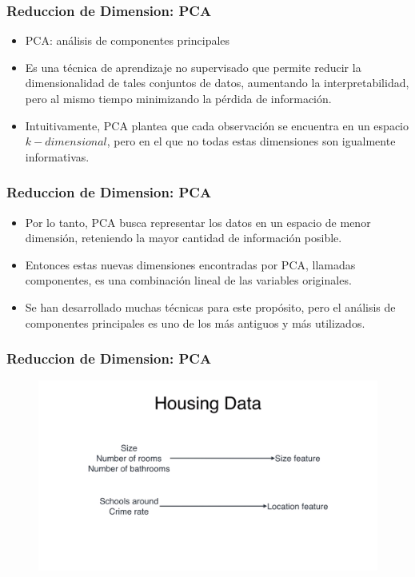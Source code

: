 \documentclass[
  shownotes,
  xcolor={svgnames},
  hyperref={colorlinks,citecolor=DarkBlue,linkcolor=DarkRed,urlcolor=DarkBlue}
  , aspectratio=169]{beamer}
\begin{document}
\begin{frame}
\frametitle{Reduccion de Dimension: PCA}


\begin{itemize}
  \item PCA: análisis de componentes principales
\medskip
\item Es una técnica de aprendizaje no supervisado que permite reducir la dimensionalidad de tales conjuntos de datos, aumentando la
interpretabilidad, pero al mismo tiempo minimizando la pérdida de información. 
\medskip
\item Intuitivamente, PCA plantea que cada observación se encuentra en un  espacio \(k-dimensional\), pero en el que no todas estas dimensiones son igualmente informativas. 

\end{itemize}
\end{frame}
\begin{frame}
\frametitle{Reduccion de Dimension: PCA}

\begin{itemize}
\item Por lo tanto, PCA busca representar los datos en un espacio de menor dimensión, reteniendo la mayor cantidad de  información posible.
\medskip

\item  Entonces estas nuevas dimensiones encontradas por PCA, llamadas componentes, es una combinación lineal de las variables  originales.
\medskip
\item Se han desarrollado muchas técnicas para este propósito, pero el análisis de componentes principales es uno de los más antiguos y más utilizados. 


\end{itemize}


\end{frame}
\begin{frame}
\frametitle{Reduccion de Dimension: PCA}

\begin{figure}[H] \centering

    \centering
    \includegraphics[scale=.25]{figures/pca1}
  \\
  \tiny
\end{figure}


\end{frame}
\end{document}
